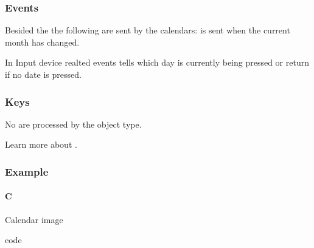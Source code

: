 \documentclass[letterpaper,10pt,english]{sphinxmanual}
\begin{document}
\subsubsection{Events}
\label{\detokenize{object-types/calendar:events}}
Besided the  the following  are sent by the calendars:
 is sent when  the current month has changed.

In Input device realted events  tells which day is currently being pressed or return  if no date is pressed.


\subsubsection{Keys}
\label{\detokenize{object-types/calendar:keys}}
No  are processed by the object type.

Learn more about {\hyperref[\detokenize{overview/indev::doc}]{}}.


\subsubsection{Example}
\label{\detokenize{object-types/calendar:example}}

\paragraph{C}
\label{\detokenize{object-types/calendar:c}}
Calendar image

code
\end{document}
